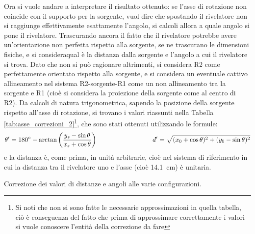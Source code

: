 Ora si vuole andare a interpretare il risultato ottenuto: se l'asse di rotazione non coincide con il supporto per la sorgente, vuol dire che spostando il rivelatore non
si raggiunge effettivamente esattamente l'angolo, si calcoli allora a quale angolo si pone il rivelatore. Trascurando ancora il fatto che il rivelatore potrebbe avere
un'orientazione non perfetta rispetto alla sorgente, se ne trascurano le dimensioni fisiche, e si consideraqual è la distanza dalla sorgente e l'angolo a cui il rivelatore
si trova. Dato che non si può ragionare altrimenti, si considera R2 come perfettamente orientato rispetto alla sorgente, e si considera un eventuale cattivo allineamento
nel sistema R2-sorgente-R1 come un non allineamento tra la sorgente e R1 (cioè si considera la proiezione della sorgente come al centro di R2). Da calcoli di natura
trigonometrica, sapendo la posizione della sorgente rispetto all'asse di rotazione, si trovano i valori riassunti nella Tabella \ref{tab:asse_correzioni_2}\footnote{Si noti
che non si sono fatte le necessarie approssimazioni in quella tabella, ciò è conseguenza del fatto che prima di approssimare correttamente i valori si vuole conoscere 
l'entità della correzione da fare}, che sono stati ottenuti utilizzando le formule:
$$\theta' = 180^\circ -\arctan\left(\frac{y_s-\sin\theta}{x_s+\cos\theta}\right) \hspace{3 cm} d' = \sqrt{(x_0+\cos\theta)^2+(y_0-\sin\theta)^2}$$
e la distanza è, come prima, in unità arbitrarie, cioè nel sistema di riferimento in cui la distanza tra il rivelatore uno e l'asse (cioè 14.1~cm) è unitaria.
%
\begin{table}[h]
	\centering
	
	\caption{Correzione dei valori di distanze e angoli alle varie configurazioni.}
	\label{tab:asse_correzioni_2}
\end{table}
%